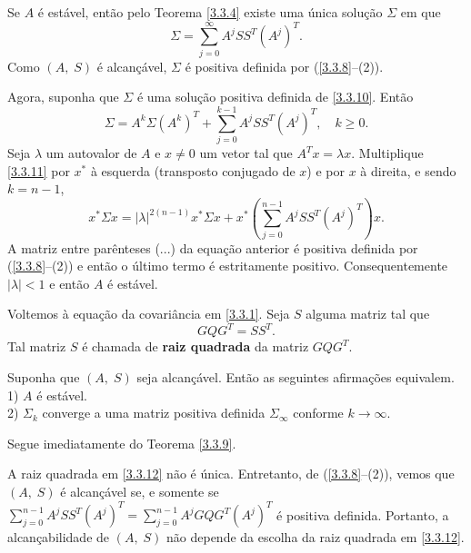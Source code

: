 \begin{Dem}
Se $A$ é estável, então pelo Teorema \ref{3.3.4} existe uma única solução $\Sigma$ em que
\[
	\Sigma = \sum_{j=0}^\infty
	 A^jSS^T(A^j)^T.
\]
Como $(A,\;S)$ é alcançável, $\Sigma$ é positiva definida por (\ref{3.3.8}--(2)).

Agora, suponha que $\Sigma$ é uma solução positiva definida de \eqref{3.3.10}. Então
\begin{equation}\label{3.3.11}
	\Sigma = A^k \Sigma (A^k)^T +
	\sum_{j=0}^{k-1}A^jSS^T(A^j)^T, \quad
	k\ge0.
\end{equation}
Seja $\lambda$ um autovalor de $A$ e $x\neq0$ um vetor tal que $A^Tx=\lambda x$. Multiplique \eqref{3.3.11} por $x^*$ à esquerda (transposto conjugado de $x$) e por $x$ à direita, e sendo $k=n-1$,
\[
	x^*\Sigma x=|\lambda|^{2(n-1)} x^*
	 \Sigma x+
	 x^*\left(\sum_{j=0}^{n-1}
	 A^jSS^T(A^j)^T\right)x.
\]
A matriz entre parênteses (...) da equação anterior é positiva definida por (\ref{3.3.8}--(2)) e então o último termo é estritamente positivo. Consequentemente $|\lambda|<1$  e então $A$ é estável.
\end{Dem}

Voltemos à equação da covariância em \eqref{3.3.1}. Seja $S$ alguma matriz tal que
\begin{equation}\label{3.3.12}
	GQG^T=SS^T.
\end{equation}
Tal matriz $S$ é chamada de \textbf{raiz quadrada} da matriz $GQG^T$.

\begin{Teo}\label{3.3.13}
Suponha que $(A,\;S)$ seja alcançável. Então as seguintes afirmações equivalem.\\
1) $A$ é estável.\\
2) $\Sigma_k$ converge a uma matriz positiva definida $\Sigma_\infty$ conforme $k\to\infty$.
\end{Teo}
\begin{Dem}
Segue imediatamente do Teorema \ref{3.3.9}.
\end{Dem}
\begin{Obs}
A raiz quadrada em \eqref{3.3.12} não é única. Entretanto, de {\rm(\ref{3.3.8}--(2))}, vemos que $(A,\;S)$ é alcançável se, e somente se $\sum_{j=0}^{n-1}A^jSS^T(A^j)^T=\sum_{j=0}^{n-1}A^jGQG^T(A^j)^T$ é positiva definida. Portanto, a alcançabilidade de $(A,\;S)$ não depende da escolha da raiz quadrada em \eqref{3.3.12}.
\end{Obs}





